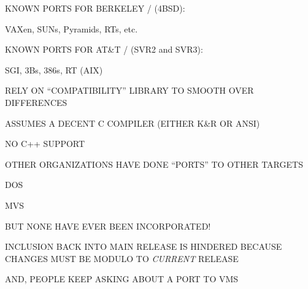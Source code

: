 \begin{bwslide}

\begin{nrtc}
\item	KNOWN PORTS FOR BERKELEY \unix/ (4BSD):
    \begin{nrtc}
    \item	VAXen, SUNs, Pyramids, RTs, etc.
    \end{nrtc}

\item	KNOWN PORTS FOR AT\&T \unix/ (SVR2 and SVR3):
    \begin{nrtc}
    \item	SGI, 3Bs, 386s, RT (AIX)
    \end{nrtc}

\item	RELY ON ``COMPATIBILITY'' LIBRARY TO SMOOTH OVER DIFFERENCES

\item	ASSUMES A DECENT C COMPILER (EITHER K\&R OR ANSI)
    \begin{nrtc}
    \item	NO C++ SUPPORT
    \end{nrtc}
\end{nrtc}
\end{bwslide}


\begin{bwslide}

\begin{nrtc}
\item	OTHER ORGANIZATIONS HAVE DONE ``PORTS'' TO OTHER TARGETS
    \begin{nrtc}
    \item	DOS

    \item	MVS
    \end{nrtc}
    BUT NONE HAVE EVER BEEN INCORPORATED!

\item	INCLUSION BACK INTO MAIN RELEASE IS HINDERED BECAUSE
	CHANGES MUST BE MODULO TO \emph{CURRENT} RELEASE

\item	AND, PEOPLE KEEP ASKING ABOUT A PORT TO VMS
\end{nrtc}
\end{bwslide}


